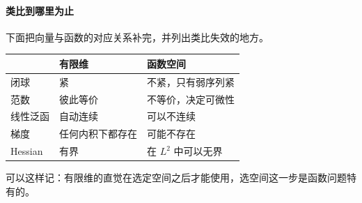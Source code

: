 \paragraph{类比到哪里为止}
下面把向量与函数的对应关系补完，并列出类比失效的地方。

\begin{BookInlineTable}
  \centering
  \caption{一阶信息的对应与差别。}
  \label{tab:func-gradient-analogy}
  \begin{tabular}{lll}
    \toprule
    & 有限维 & 函数空间\\
    \midrule
    闭球 & 紧 & 不紧，只有弱序列紧\\
    范数 & 彼此等价 & 不等价，决定可微性\\
    线性泛函 & 自动连续 & 可以不连续\\
    梯度 & 任何内积下都存在 & 可能不存在\\
    Hessian & 有界 & 在 $L^2$ 中可以无界\\
    \bottomrule
  \end{tabular}
\end{BookInlineTable}

可以这样记：有限维的直觉在选定空间之后才能使用，选空间这一步是函数问题特有的。
